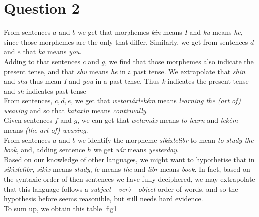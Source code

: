 \documentclass{cours}
\begin{document}
    \section{Question 2}
        From sentences $a$ and $b$ we get that morphemes \textsl{kin} means \textsl{I} and \textsl{ku} means \textsl{he}, since those morphemes are the only that differ. Similarly, we get from sentences $d$ and $e$ that \textsl{ka} means \textsl{you}.\\
        Adding to that sentences $c$ and $g$, we find that those morphemes also indicate the present tense, and that \textsl{shu} means \textsl{he} in a past tense. We extrapolate that \textsl{shin} and \textsl{sha} thus mean \textsl{I} and \textsl{you} in a past tense. Thus \textsl{k} indicates the present tense and \textsl{sh} indicates past tense \\
        From sentences, $c, d, e$, we get that \textsl{wetam\'{a}xlek\'{e}m} means \textsl{learning the (art of) weaving} and so that \textsl{katax\'{ı}n} means \textsl{continually}.\\
        Given sentences $f$ and $g$, we can get that \textsl{wetam\'{a}x} means \textsl{to learn} and \textsl{lek\'{e}m} means \textsl{(the art of) weaving}.\\
        From sentences $a$ and $b$ we identify the morpheme \textsl{sik\'{ı}xlel\'{ı}br} to mean \textsl{to study the book}, and, adding sentence $h$ we get \textsl{w\'{ı}r} means \textsl{yesterday}.\\
        Based on our knowledge of other languages, we might want to hypothetise that in \textsl{sik\'{ı}xlel\'{ı}br}, \textsl{sik\'{ı}x} means \textsl{study}, \textsl{le} means \textsl{the} and \textsl{l\'{ı}br} means \textsl{book}. 
        In fact, based on the syntaxic order of then sentences we have fully deciphered, we may extrapolate that this language follows a \textsl{subject - verb - object} order of words, and so the hypothesis before seems reasonible, but still needs hard evidence. \\
        To sum up, we obtain this table \ref{fig1}\\
\end{document}
